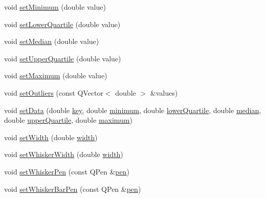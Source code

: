 \begin{DoxyCompactItemize}
\item 
void \hyperlink{class_q_c_p_statistical_box_a84ff7cc61ba44890f0c3e0c99c19941e}{set\-Minimum} (double value)
\item 
void \hyperlink{class_q_c_p_statistical_box_a680941af5e23d902013962fa67223f9e}{set\-Lower\-Quartile} (double value)
\item 
void \hyperlink{class_q_c_p_statistical_box_a65970e77a897da4ecb4b15300868aad3}{set\-Median} (double value)
\item 
void \hyperlink{class_q_c_p_statistical_box_a65a1375f941c5a2077b5201229e89346}{set\-Upper\-Quartile} (double value)
\item 
void \hyperlink{class_q_c_p_statistical_box_acec5ad1901f00f2c5387cfb4d9787eb3}{set\-Maximum} (double value)
\item 
void \hyperlink{class_q_c_p_statistical_box_af9bc09620e0bf93bf444ee35e5800d1d}{set\-Outliers} (const Q\-Vector$<$ double $>$ \&values)
\item 
void \hyperlink{class_q_c_p_statistical_box_adf50c57b635edb12470c0e4a986aff37}{set\-Data} (double \hyperlink{class_q_c_p_statistical_box_a767af754f39872d6308b900a0d1758ca}{key}, double \hyperlink{class_q_c_p_statistical_box_acd94c05d59c05d9146d3b60d9f52df82}{minimum}, double \hyperlink{class_q_c_p_statistical_box_af9c4a98f5ca95b5a5a8b140f57b64ace}{lower\-Quartile}, double \hyperlink{class_q_c_p_statistical_box_a44abdee617fe0bca72e6a2ea3fd492de}{median}, double \hyperlink{class_q_c_p_statistical_box_abd15951907b54343a89b1f7feddcb7a7}{upper\-Quartile}, double \hyperlink{class_q_c_p_statistical_box_a928bcf07dd2176affad91d85be03172f}{maximum})
\item 
void \hyperlink{class_q_c_p_statistical_box_a0b62775bd67301b1eba5c785f2b26f14}{set\-Width} (double \hyperlink{class_q_c_p_statistical_box_a0733a7bd575fc5929ce6d507bcc2a04c}{width})
\item 
void \hyperlink{class_q_c_p_statistical_box_adf378812446bd66f34d1f7f293d991cd}{set\-Whisker\-Width} (double \hyperlink{class_q_c_p_statistical_box_a0733a7bd575fc5929ce6d507bcc2a04c}{width})
\item 
void \hyperlink{class_q_c_p_statistical_box_a4a5034cb3b9b040444df05ab1684620b}{set\-Whisker\-Pen} (const Q\-Pen \&\hyperlink{class_q_c_p_abstract_plottable_a41d060007cc6b3037c9c04d22d0c0398}{pen})
\item 
void \hyperlink{class_q_c_p_statistical_box_aa8d3e503897788e1abf68dc74b5f147f}{set\-Whisker\-Bar\-Pen} (const Q\-Pen \&\hyperlink{class_q_c_p_abstract_plottable_a41d060007cc6b3037c9c04d22d0c0398}{pen})

\end{DoxyCompactItemize}
